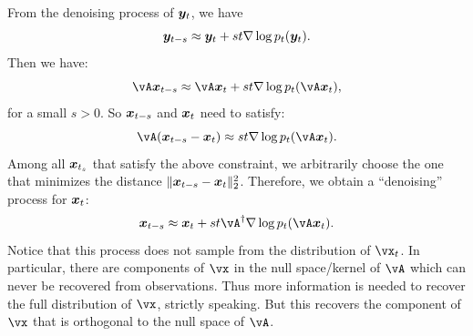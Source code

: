 \documentclass[../../book-main.tex]{subfiles}
\begin{document}
From the denoising process of $\bm{y}_t$, we have
\begin{equation}
    \bm{y}_{t-s} \approx  \bm{y}_t + st \nabla \log p_t(\bm{y}_t).
\end{equation}
Then we have:
\begin{equation}
    \vA\x_{t-s} \approx   \vA\x_t + st \nabla \log p_t(\vA \x_t),
\end{equation}
for a small $s >0$. So $\bm{x}_{t-s}$ and $\bm{x}_t$ need to satisfy:
\begin{equation}
    \vA(\x_{t-s} - \x_t) \approx st \nabla \log p_t(\vA\x_t). 
\end{equation}
Among all $\bm{x}_{t_s}$ that satisfy the above constraint, we arbitrarily choose the one that minimizes the distance $\|\bm{x}_{t-s} - \bm{x}_t\|_2^2$. Therefore, we obtain a ``denoising'' process for $\bm{x}_t$:
\begin{equation}
    \x_{t-s}  \approx \x_t + st\vA^\dagger \nabla \log p_t(\vA\x_t). 
\label{eqn:denoising-projection}
\end{equation}
Notice that this process does not sample from the distribution of $\vx_t$. In particular, there are components of $\vx$ in the null space/kernel of $\vA$ which can never be recovered from observations. Thus more information is needed to recover the full distribution of $\vx$, strictly speaking. But this recovers the component of $\vx$ that is orthogonal to the null space of $\vA$.

\end{document}
